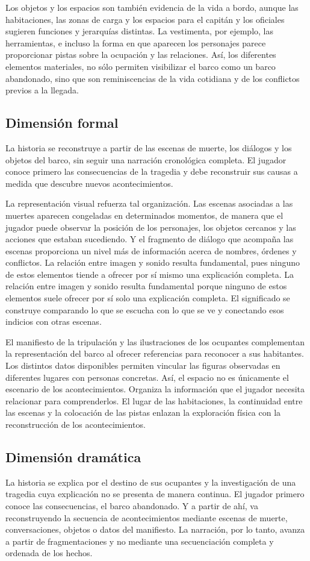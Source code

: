 \documentclass[12pt,a4paper]{article}
\begin{document}
Los objetos y los espacios son también evidencia de la vida a bordo, aunque las habitaciones, las zonas de carga y los espacios para el capitán y los oficiales sugieren funciones y jerarquías distintas. La vestimenta, por ejemplo, las herramientas, e incluso la forma en que aparecen los personajes parece proporcionar pistas sobre la ocupación y las relaciones. Así, los diferentes elementos materiales, no sólo permiten visibilizar el barco como un barco abandonado, sino que son reminiscencias de la vida cotidiana y de los conflictos previos a la llegada.

\subsection{Dimensión formal}
La historia se reconstruye a partir de las escenas de muerte, los diálogos y los objetos del barco, sin seguir una narración cronológica completa. El jugador conoce primero las consecuencias de la tragedia y debe reconstruir sus causas a medida que descubre nuevos acontecimientos.

La representación visual refuerza tal organización. Las escenas asociadas a las muertes aparecen congeladas en determinados momentos, de manera que el jugador puede observar la posición de los personajes, los objetos cercanos y las acciones que estaban sucediendo. Y el fragmento de diálogo que acompaña las escenas proporciona un nivel más de información acerca de nombres, órdenes y conflictos. La relación entre imagen y sonido resulta fundamental, pues ninguno de estos elementos tiende a ofrecer por sí mismo una explicación completa. La relación entre imagen y sonido resulta fundamental porque ninguno de estos elementos suele ofrecer por sí solo una explicación completa. El significado se construye comparando lo que se escucha con lo que se ve y conectando esos indicios con otras escenas.

El manifiesto de la tripulación y las ilustraciones de los ocupantes complementan la representación del barco al ofrecer referencias para reconocer a sus habitantes. Los distintos datos disponibles permiten vincular las figuras observadas en diferentes lugares con personas concretas. Así, el espacio no es únicamente el escenario de los acontecimientos. Organiza la información que el jugador necesita relacionar para comprenderlos. El lugar de las habitaciones, la continuidad entre las escenas y la colocación de las pistas enlazan la exploración física con la reconstrucción de los acontecimientos.

\subsection{Dimensión dramática}
La historia se explica por el destino de sus ocupantes y la investigación de una tragedia cuya explicación no se presenta de manera continua. El jugador primero conoce las consecuencias, el barco abandonado. Y a partir de ahí, va reconstruyendo la secuencia de acontecimientos mediante escenas de muerte, conversaciones, objetos o datos del manifiesto. La narración, por lo tanto, avanza a partir de fragmentaciones y no mediante una secuenciación completa y ordenada de los hechos.
\end{document}
